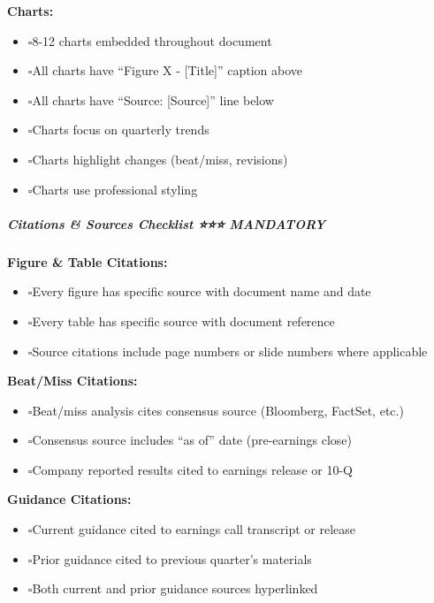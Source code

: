 \documentclass[11pt]{article}
\newcommand{\UncheckedBox}{$\square$}
\begin{document}
\textbf{Charts:}

\begin{itemize}[leftmargin=*,itemsep=2pt,topsep=2pt]
\item {} \UncheckedBox 8-12 charts embedded throughout document
\item {} \UncheckedBox All charts have ``Figure X - [Title]'' caption above
\item {} \UncheckedBox All charts have ``Source: [Source]'' line below
\item {} \UncheckedBox Charts focus on quarterly trends
\item {} \UncheckedBox Charts highlight changes (beat/miss, revisions)
\item {} \UncheckedBox Charts use professional styling
\end{itemize}

\subparagraph{Citations \& Sources Checklist ⭐⭐⭐ MANDATORY}\mbox{}\par

\textbf{Figure \& Table Citations:}

\begin{itemize}[leftmargin=*,itemsep=2pt,topsep=2pt]
\item {} \UncheckedBox Every figure has specific source with document name and date
\item {} \UncheckedBox Every table has specific source with document reference
\item {} \UncheckedBox Source citations include page numbers or slide numbers where applicable
\end{itemize}

\textbf{Beat/Miss Citations:}

\begin{itemize}[leftmargin=*,itemsep=2pt,topsep=2pt]
\item {} \UncheckedBox Beat/miss analysis cites consensus source (Bloomberg, FactSet, etc.)
\item {} \UncheckedBox Consensus source includes ``as of'' date (pre-earnings close)
\item {} \UncheckedBox Company reported results cited to earnings release or 10-Q
\end{itemize}

\textbf{Guidance Citations:}

\begin{itemize}[leftmargin=*,itemsep=2pt,topsep=2pt]
\item {} \UncheckedBox Current guidance cited to earnings call transcript or release
\item {} \UncheckedBox Prior guidance cited to previous quarter's materials
\item {} \UncheckedBox Both current and prior guidance sources hyperlinked
\end{itemize}
\end{document}
